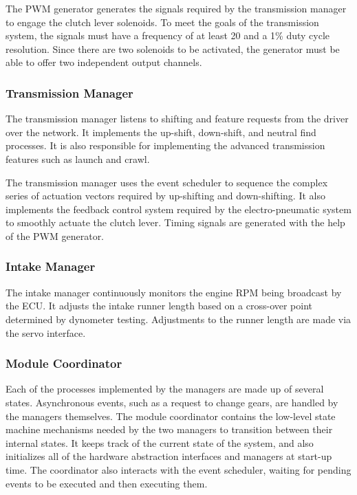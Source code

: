 The PWM generator generates the signals required by the transmission manager to engage the clutch lever solenoids. To meet the goals of the transmission system, the signals must have a frequency of at least \unit{20}{\hertz} and a 1\% duty cycle resolution. Since there are two solenoids to be activated, the generator must be able to offer two independent output channels.

\subsubsection{Transmission Manager}

The transmission manager listens to shifting and feature requests from the driver over the network. It implements the up-shift, down-shift, and neutral find processes. It is also responsible for implementing the advanced transmission features such as launch and crawl.

The transmission manager uses the event scheduler to sequence the complex series of actuation vectors required by up-shifting and down-shifting. It also implements the feedback control system required by the electro-pneumatic system to smoothly actuate the clutch lever. Timing signals are generated with the help of the PWM generator.

\subsubsection{Intake Manager}

The intake manager continuously monitors the engine RPM being broadcast by the ECU. It adjusts the intake runner length based on a cross-over point determined by dynometer testing. Adjustments to the runner length are made via the servo interface.


\subsubsection{Module Coordinator}

Each of the processes implemented by the managers are made up of several states. Asynchronous events, such as a request to change gears, are handled by the managers themselves. The module coordinator contains the low-level state machine mechanisms needed by the two managers to transition between their internal states. It keeps track of the current state of the system, and also initializes all of the hardware abstraction interfaces and managers at start-up time. The coordinator also interacts with the event scheduler, waiting for pending events to be executed and then executing them.
